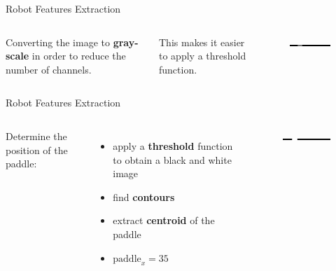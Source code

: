 \begin{frame}{Robot Features Extraction}
    \begin{columns}[c,onlytextwidth]
            \parbox{0.95\textwidth}{
                Converting the image to \textbf{gray-scale} in order to
                reduce the number of channels.

                This makes it easier to apply a threshold \mbox{function}.
            }
            \begin{figure}
                \includegraphics[width=\textwidth]{images/robotfeaturesextractorsequence/robotfeatures-bottom-part-gray.jpg}
            \end{figure}
    \end{columns}
\end{frame}

\begin{frame}{Robot Features Extraction}
    \begin{columns}[c,onlytextwidth]
            Determine the position of the paddle:
            \begin{itemize}
                \item apply a \textbf{threshold} function to obtain a black and white image
                \item find \textbf{contours}
                \item extract \textbf{centroid} of the paddle
                \item $\text{paddle}_x=35$
            \end{itemize}
            \begin{figure}
                \includegraphics[width=\textwidth]{images/robotfeaturesextractorsequence/robotfeatures-bottom-part-threshold.jpg}
            \end{figure}
    \end{columns}
\end{frame}

